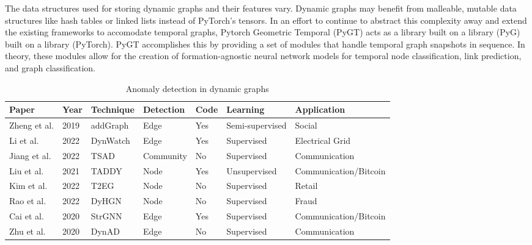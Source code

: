 The data structures used for storing dynamic graphs and their features vary. Dynamic graphs may benefit from malleable, mutable data structures like hash tables or linked lists instead of PyTorch's tensors\cite{fallenvalkyrie_tensors_2021}. In an effort to continue to abstract this complexity away and extend the existing frameworks to accomodate temporal graphs, Pytorch Geometric Temporal (PyGT)\cite{rozemberczki_pytorch_2021} acts as a library built on a library (PyG) built on a library (PyTorch).  PyGT  accomplishes this by providing a set of modules that handle temporal graph snapshots in sequence. In theory, these modules allow for the creation of formation-agnostic neural network models for temporal node classification, link prediction, and graph classification. 

\begin{table}
    \caption{Anomaly detection in dynamic graphs}
    \label{table-2}
    \begin{tabular}{|l|l|l|l|l|l|l|}
        \hline Paper &  Year & Technique & Detection & Code & Learning & Application \\ \hline
        Zheng et al.\cite{zheng_addgraph_2019} & 2019 & addGraph & Edge & Yes & Semi-supervised & Social\\
        Li et al.\cite{li_dynamic_2022} & 2022 & DynWatch  & Edge & Yes & Supervised & Electrical Grid\\
        Jiang et al.\cite{jiang_two-stage_2022} & 2022 & TSAD & Community & No & Supervised & Communication\\
        Liu et al.\cite{liu_anomaly_2021}& 2021 & TADDY & Node & Yes & Unsupervised & Communication/Bitcoin\\
        Kim et al.\cite{kim_temporal_2022} & 2022 & T2EG & Node & No & Supervised & Retail \\
        Rao et al.\cite{rao_modelling_2022} & 2022 & DyHGN & Node & No & Supervised & Fraud \\
        Cai et al.\cite{cai_structural_2020} & 2020 & StrGNN & Edge & Yes & Supervised & Communication/Bitcoin\\
        Zhu et al.\cite{zhu_flexible_2020} & 2020 & DynAD & Edge & No & Supervised & Communication \\
        \hline
    \end{tabular}
\end{table}

